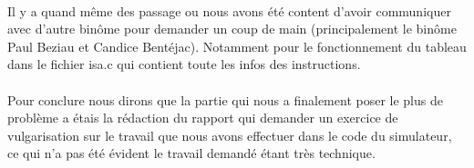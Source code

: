 \documentclass[12pt]{article}
\begin{document}
\paragraph{} Il y a quand même des passage ou nous avons été content d'avoir communiquer avec d'autre binôme pour demander un coup de main (principalement le binôme Paul Beziau et Candice Bentéjac). Notamment pour le fonctionnement du tableau dans le fichier isa.c qui contient toute les infos des instructions.

\paragraph{} Pour conclure nous dirons que la partie qui nous a finalement poser le plus de problème a étais la rédaction du rapport qui demander un exercice de vulgarisation sur le travail que nous avons effectuer dans le code du simulateur, ce qui n'a pas été évident le travail demandé étant très technique.
\end{document}
